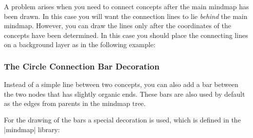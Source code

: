 A problem arises when you need to connect concepts after the main mindmap has
been drawn. In this case you will want the connection lines to lie
\emph{behind} the main mindmap. However, you can draw the lines only after the
coordinates of the concepts have been determined. In this case you should place
the connecting lines on a background layer as in the following example:

\begin{codeexample}[preamble={\usetikzlibrary{backgrounds,mindmap}}]
\end{codeexample}


\subsubsection{The Circle Connection Bar Decoration}

Instead of a simple line between two concepts, you can also add a bar between
the two nodes that has slightly organic ends. These bars are also used by
default as the edges from parents in the mindmap tree.

For the drawing of the bars a special decoration is used, which is defined in
the |mindmap| library:

